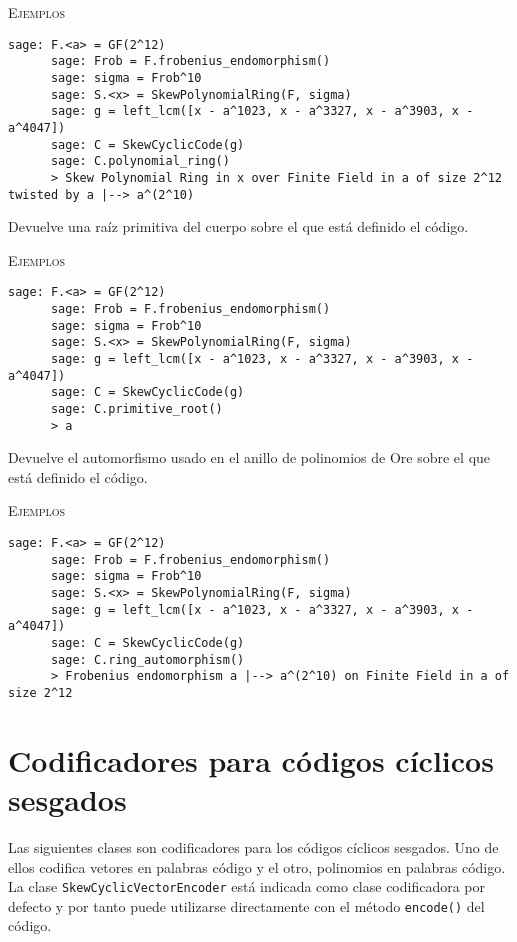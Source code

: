 \begin{description}[leftmargin=1em, font=\normalfont\ttfamily, style=nextline]
\begin{description}[font=\ttfamily, style=nextline]
    \textsc{Ejemplos}
    \begin{lstlisting}[gobble=6]
      sage: F.<a> = GF(2^12)
      sage: Frob = F.frobenius_endomorphism()
      sage: sigma = Frob^10
      sage: S.<x> = SkewPolynomialRing(F, sigma)
      sage: g = left_lcm([x - a^1023, x - a^3327, x - a^3903, x - a^4047])
      sage: C = SkewCyclicCode(g)
      sage: C.polynomial_ring()
      > Skew Polynomial Ring in x over Finite Field in a of size 2^12 twisted by a |--> a^(2^10)
    \end{lstlisting} 
    \item[primitive\_root()] Devuelve una raíz primitiva del cuerpo sobre el que está definido el código.
     
    \textsc{Ejemplos}
    \begin{lstlisting}[gobble=6]
      sage: F.<a> = GF(2^12)
      sage: Frob = F.frobenius_endomorphism()
      sage: sigma = Frob^10
      sage: S.<x> = SkewPolynomialRing(F, sigma)
      sage: g = left_lcm([x - a^1023, x - a^3327, x - a^3903, x - a^4047])
      sage: C = SkewCyclicCode(g)
      sage: C.primitive_root()
      > a
    \end{lstlisting}
    \item[ring\_automorphism()] Devuelve el automorfismo usado en el anillo de polinomios de Ore sobre el que está definido el código.
     
    \textsc{Ejemplos}
    \begin{lstlisting}[gobble=6]
      sage: F.<a> = GF(2^12)
      sage: Frob = F.frobenius_endomorphism()
      sage: sigma = Frob^10
      sage: S.<x> = SkewPolynomialRing(F, sigma)
      sage: g = left_lcm([x - a^1023, x - a^3327, x - a^3903, x - a^4047])
      sage: C = SkewCyclicCode(g)
      sage: C.ring_automorphism()
      > Frobenius endomorphism a |--> a^(2^10) on Finite Field in a of size 2^12
    \end{lstlisting} 
  \end{description}
\end{description}

\section{Codificadores para códigos cíclicos sesgados}

Las siguientes clases son codificadores para los códigos cíclicos sesgados.
Uno de ellos codifica vetores en palabras código y el otro, polinomios en palabras código.
La clase \texttt{SkewCyclicVectorEncoder} está indicada como clase codificadora por defecto y por tanto puede utilizarse directamente con el método \texttt{encode()} del código.

